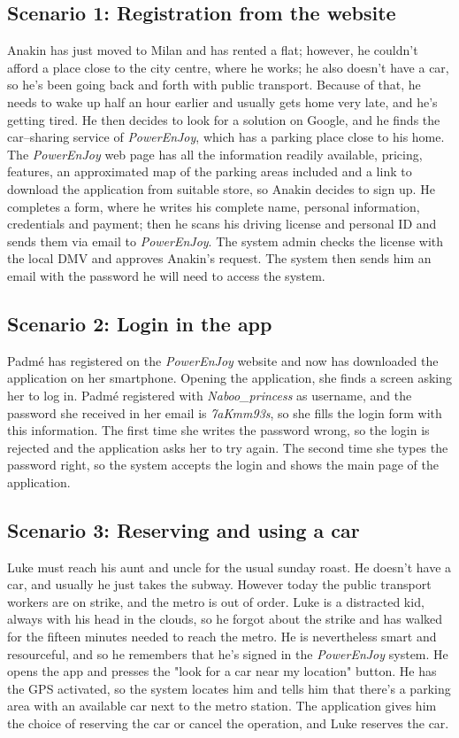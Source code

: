 \subsection{Scenario 1: Registration from the website}
	Anakin has just moved to Milan and has rented a flat; however, he couldn't afford a place close to the city centre, where he works; he also doesn't have a car, so he's been going back and forth with public transport. Because of that, he needs to wake up half an hour earlier and usually gets home very late, and he's getting tired. He then decides to look for a solution on Google, and he finds the car–sharing service of \textit{PowerEnJoy}, which has a parking place close to his home. The \textit{PowerEnJoy} web page has all the information readily available, pricing, features, an approximated map of the parking areas included and a link to download the application from suitable store, so Anakin decides to sign up. He completes a form, where he writes his complete name, personal information, credentials and payment; then he scans his driving license and personal ID and sends them via email to \textit{PowerEnJoy}. The system admin checks the license with the local DMV and approves Anakin's request. The system then sends him an email with the password he will need to access the system.
		
\subsection{Scenario 2: Login in the app} %
	Padmé has registered on the \textit{PowerEnJoy} website and now has downloaded the application on her smartphone. Opening the application, she finds a screen asking her to log in. Padmé registered with \textit{Naboo\_princess} as username, and the password she received in her email is \textit{7aKmm93s}, so she fills the login form with this information. The first time she writes the password wrong, so the login is rejected and the application asks her to try again. The second time she types the password right, so the system accepts the login and shows the main page of the application.
	
\subsection{Scenario 3: Reserving and using a car}
	Luke must reach his aunt and uncle for the usual sunday roast. He doesn't have a car, and usually he just takes the subway. However today the public transport workers are on strike, and the metro is out of order. Luke is a distracted kid, always with his head in the clouds, so he forgot about the strike and has walked for the fifteen minutes needed to reach the metro. He is nevertheless smart and resourceful, and so he remembers that he's signed in the \textit{PowerEnJoy} system. He opens the app and presses the "look for a car near my location" button. He has the GPS activated, so the system locates him and tells him that there's a parking area with an available car next to the metro station. The application gives him the choice of reserving the car or cancel the operation, and Luke reserves the car. 
	
